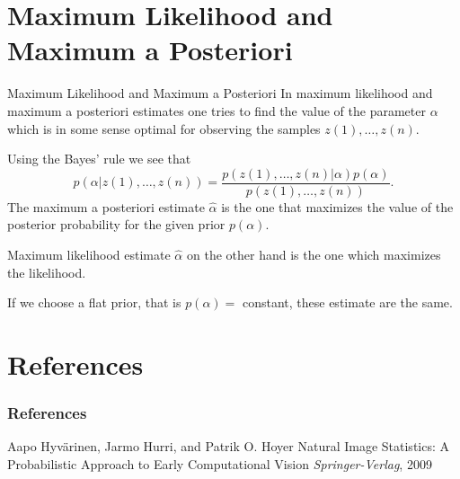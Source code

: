 \documentclass{beamer}
\begin{document}
\section{Maximum Likelihood and Maximum a Posteriori}

\begin{frame}{Maximum Likelihood and Maximum a Posteriori}
  In maximum likelihood and maximum a posteriori estimates one tries to find
  the value of the parameter $\alpha$ which is in some sense optimal for
  observing the samples $z(1), \ldots , z(n)$.

  Using the Bayes' rule we see that
  \[
  p(\alpha| z(1), \ldots , z(n)) = \frac{p(z(1), \ldots , z(n)|\alpha)p(\alpha)}{p(z(1), \ldots , z(n))}.
  \]
  The maximum a posteriori estimate $\hat{\alpha}$ is the one that maximizes
  the value of the posterior probability for the given prior $p(\alpha)$.

  Maximum likelihood estimate $\hat{\alpha}$ on the other hand is the one which
  maximizes the likelihood.

  If we choose a flat prior, that is $p(\alpha) =$ constant, these estimate are
  the same.
\end{frame}

\section{References}

\begin{frame}
\frametitle{References}
\footnotesize{
\begin{thebibliography}{09}
 Aapo Hyvärinen, Jarmo Hurri, and Patrik O. Hoyer
\newblock Natural Image Statistics: A Probabilistic Approach to Early Computational Vision
\newblock \emph{Springer-Verlag}, 2009
\end{thebibliography}
}
\end{frame}
\end{document}
